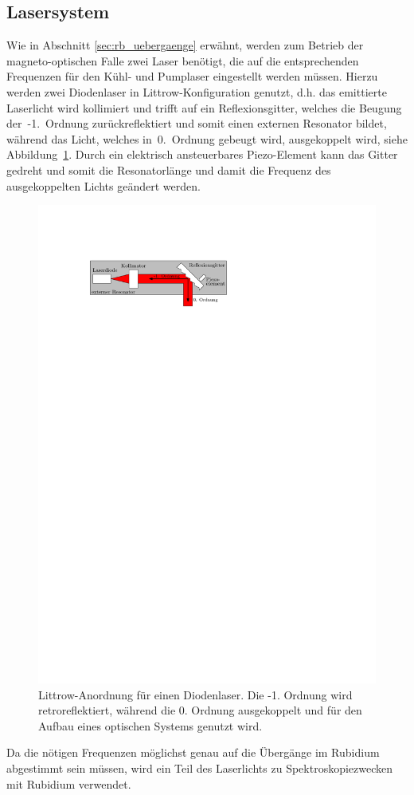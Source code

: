 \documentclass[11pt, a4paper]{article}
\numberwithin{equation}{section}
\begin{document}
\subsection{Lasersystem}

Wie in Abschnitt \ref{sec:rb_uebergaenge} erwähnt, werden zum Betrieb der magneto-optischen Falle zwei Laser benötigt, die auf die entsprechenden Frequenzen für den Kühl- und Pumplaser eingestellt werden müssen.
Hierzu werden zwei Diodenlaser in Littrow-Konfiguration genutzt, d.h. das emittierte Laserlicht wird kollimiert und trifft auf ein Reflexionsgitter, welches die Beugung der~-1.~Ordnung zurückreflektiert und somit einen externen Resonator bildet, während das Licht, welches in~0.~Ordnung gebeugt wird, ausgekoppelt wird, siehe Abbildung~\ref{fig:littrow}.
Durch ein elektrisch ansteuerbares Piezo-Element kann das Gitter gedreht und somit die Resonatorlänge und damit die Frequenz des ausgekoppelten Lichts geändert werden.
\begin{figure}[htb]
	\centering
	\includegraphics[width=.7\textwidth]{./figures/theory/littrow}
	\caption{Littrow-Anordnung für einen Diodenlaser. Die -1. Ordnung wird retroreflektiert, während die 0. Ordnung ausgekoppelt und für den Aufbau eines optischen Systems genutzt wird.}
	\label{fig:littrow}
\end{figure}
Da die nötigen Frequenzen möglichst genau auf die Übergänge im Rubidium abgestimmt sein müssen, wird ein Teil des Laserlichts zu Spektroskopiezwecken mit Rubidium verwendet.
\end{document}
